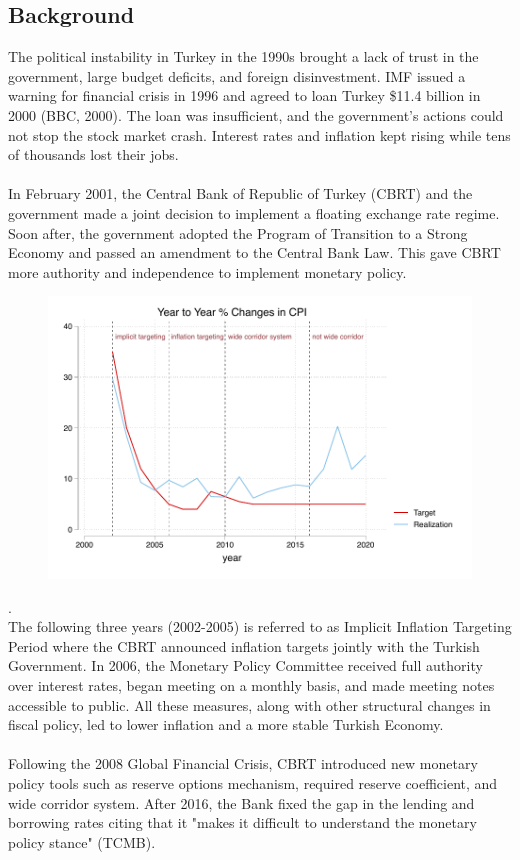 \documentclass{article}
\begin{document}
\subsection{Background}

    The political instability in Turkey in the 1990s brought a lack of trust in the government, large budget deficits, and foreign disinvestment. IMF issued a warning for financial crisis in 1996 and agreed to loan Turkey \$11.4 billion in 2000 (BBC, 2000). The loan was insufficient, and the government's actions could not stop the stock market crash. Interest rates and inflation kept rising while tens of thousands lost their jobs.
    \\ \\
    In February 2001, the Central Bank of Republic of Turkey (CBRT) and the government made a joint decision to implement a floating exchange rate regime. Soon after, the government adopted the Program of Transition to a Strong Economy and passed an amendment to the Central Bank Law. This gave CBRT more authority and independence to implement monetary policy.
    \begin{figure}[H]
        \centering
        \includegraphics[width=\linewidth]{turkey_taylor/cb_inflation.pdf}
    \end{figure}
    {\tiny .}\\
    The following three years (2002-2005) is referred to as Implicit Inflation Targeting Period where the CBRT announced inflation targets jointly with the Turkish Government. In 2006, the Monetary Policy Committee received full authority over interest rates, began meeting on a monthly basis, and made meeting notes accessible to public. All these measures, along with other structural changes in fiscal policy, led to lower inflation and a more stable Turkish Economy.
    \\ \\
    Following the 2008 Global Financial Crisis, CBRT introduced new monetary policy tools such as reserve options mechanism, required reserve coefficient, and wide corridor system. After 2016, the Bank fixed the gap in the lending and borrowing rates citing that it "makes it difficult to understand the monetary policy stance" (TCMB).
    
\end{document}

